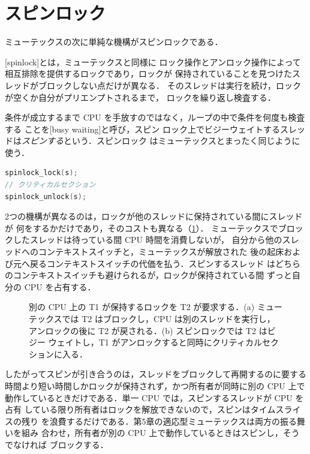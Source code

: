 \documentclass[../main.tex]{subfiles}
\begin{document}
\section{スピンロック}
\label{sec:l10-spinlock}

ミューテックスの次に単純な機構がスピンロックである．

\begin{definition}[スピンロック]
  [spinlock]とは，ミューテックスと同様に
  ロック操作とアンロック操作によって相互排除を提供するロックであり，ロックが
  保持されていることを見つけたスレッドがブロックしない点だけが異なる．
  そのスレッドは実行を続け，ロックが空くか自分がプリエンプトされるまで，
  ロックを繰り返し検査する．
\end{definition}

条件が成立するまで CPU を手放すのではなく，ループの中で条件を何度も検査する
ことを[busy waiting]と呼び，スピン
ロック上でビジーウェイトするスレッドは\emph{スピンする}という．スピンロック
はミューテックスとまったく同じように使う．
\begin{lstlisting}[language=C, numbers=none]
spinlock_lock(s);
// クリティカルセクション
spinlock_unlock(s);
\end{lstlisting}

2つの機構が異なるのは，ロックが他のスレッドに保持されている間にスレッドが
何をするかだけであり，そのコストも異なる（\cref{fig:l10-spin-block}）．
ミューテックスでブロックしたスレッドは待っている間 CPU 時間を消費しないが，
自分から他のスレッドへのコンテキストスイッチと，ミューテックスが解放された
後の起床および元へ戻るコンテキストスイッチの代価を払う．スピンするスレッド
はどちらのコンテキストスイッチも避けられるが，ロックが保持されている間
ずっと自分の CPU を占有する．

\begin{figure}[htbp]
  \centering
  
  \caption{別の CPU 上の T1 が保持するロックを T2 が要求する．(a)
    ミューテックスでは T2 はブロックし，CPU は別のスレッドを実行し，
    アンロックの後に T2 が戻される．(b) スピンロックでは T2 はビジー
    ウェイトし，T1 がアンロックすると同時にクリティカルセクションに入る．}
  \label{fig:l10-spin-block}
\end{figure}

したがってスピンが引き合うのは，スレッドをブロックして再開するのに要する
時間より短い時間しかロックが保持されず，かつ所有者が同時に別の CPU 上で
動作しているときだけである．単一 CPU では，スピンするスレッドが CPU を占有
している限り所有者はロックを解放できないので，スピンはタイムスライスの残り
を浪費するだけである．第5章の適応型ミューテックスは両方の振る舞いを組み
合わせ，所有者が別の CPU 上で動作しているときはスピンし，そうでなければ
ブロックする．
\end{document}
